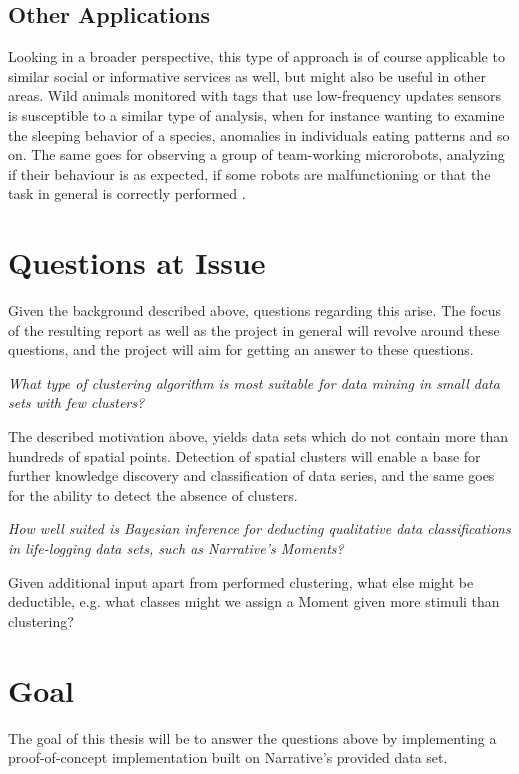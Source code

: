 \subsection{Other Applications}
Looking in a broader perspective, this type of approach is 
of course applicable to similar social or informative services as well, 
but might also be useful in other areas. Wild animals monitored with tags 
that use low-frequency updates sensors is susceptible to a similar type of 
analysis, when for instance wanting to examine the sleeping behavior of a 
species, anomalies in individuals eating patterns and so on. The same goes 
for observing a group of team-working microrobots, analyzing if their 
behaviour is as expected, if some robots are malfunctioning or that the 
task in general is correctly performed \cite{discovering-moving-clusters}.

\section{Questions at Issue}

Given the background described above, questions regarding this arise. 
The focus of the resulting report as well as the project in general will 
revolve around these questions, and the project will aim for getting an 
answer to these questions.

\emph{ 
    What type of clustering algorithm is most suitable for data mining 
    in small data sets with few clusters? } 
    \thequestion\label{question:clustering}

The described motivation above, yields data sets which do not contain 
more than hundreds of spatial points. Detection of spatial clusters will 
enable a base for further knowledge discovery and classification of data 
series, and the same goes for the ability to detect the absence of 
clusters.

\emph{ 
    How well suited is Bayesian inference for deducting qualitative data 
    classifications in life-logging data sets, such as Narrative's 
    Moments? } \thequestion\label{question:bayes}

Given additional input apart from performed clustering, what else might be 
deductible, e.g. what classes might we assign a Moment given more stimuli 
than clustering? 

\section{Goal}
The goal of this thesis will be to answer the questions above by implementing a
proof-of-concept implementation built on Narrative's provided data set. 

